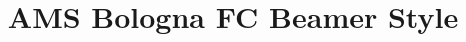 \newcommand{\swatch}[1]{\fcolorbox{bolognafcsilver!70!black}{#1}{\rule{0pt}{1.3ex}\rule{2.2ex}{0pt}}}
\title[AMS Bologna FC Beamer Style]
{AMS Bologna FC Beamer Style}
